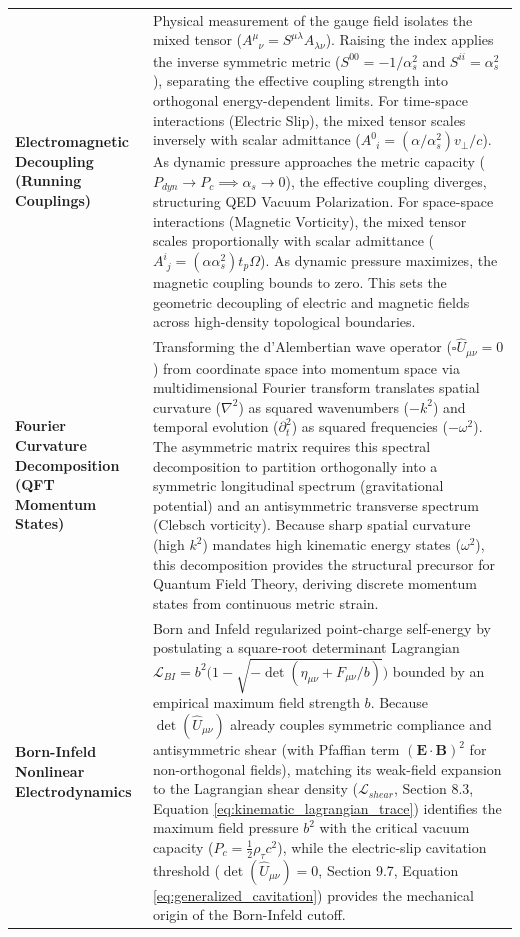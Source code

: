\begin{longtable}{p{} p{}}
    \textbf{Electromagnetic Decoupling (Running Couplings)} & Physical measurement of the gauge field isolates the mixed tensor ($A^\mu_{\phantom{\mu}\nu} = S^{\mu\lambda}A_{\lambda\nu}$). Raising the index applies the inverse symmetric metric ($S^{00} = -1/\alpha_s^2$ and $S^{ii} = \alpha_s^2$), separating the effective coupling strength into orthogonal energy-dependent limits. For time-space interactions (Electric Slip), the mixed tensor scales inversely with scalar admittance ($A^0_{\phantom{0}i} = (\alpha/\alpha_s^2) v_{\perp}/c$). As dynamic pressure approaches the metric capacity ($P_{dyn} \to P_c \implies \alpha_s \to 0$), the effective coupling diverges, structuring QED Vacuum Polarization. For space-space interactions (Magnetic Vorticity), the mixed tensor scales proportionally with scalar admittance ($A^i_{\phantom{i}j} = (\alpha \alpha_s^2) t_p \Omega$). As dynamic pressure maximizes, the magnetic coupling bounds to zero. This sets the geometric decoupling of electric and magnetic fields across high-density topological boundaries. \\ 
    \textbf{Fourier Curvature Decomposition (QFT Momentum States)} & Transforming the d'Alembertian wave operator ($\square \hat{U}_{\mu\nu} = 0$) from coordinate space into momentum space via multidimensional Fourier transform translates spatial curvature ($\nabla^2$) as squared wavenumbers ($-k^2$) and temporal evolution ($\partial_t^2$) as squared frequencies ($-\omega^2$). The asymmetric matrix requires this spectral decomposition to partition orthogonally into a symmetric longitudinal spectrum (gravitational potential) and an antisymmetric transverse spectrum (Clebsch vorticity). Because sharp spatial curvature (high $k^2$) mandates high kinematic energy states ($\omega^2$), this decomposition provides the structural precursor for Quantum Field Theory, deriving discrete momentum states from continuous metric strain. \\ 
    \textbf{Born-Infeld Nonlinear Electrodynamics} & Born and Infeld \cite{BornInfeld1934} regularized point-charge self-energy by postulating a square-root determinant Lagrangian $\mathcal{L}_{BI} = b^2\big(1 - \sqrt{-\det(\eta_{\mu\nu} + F_{\mu\nu}/b)}\big)$ bounded by an empirical maximum field strength $b$. Because $\det(\hat{U}_{\mu\nu})$ already couples symmetric compliance and antisymmetric shear (with Pfaffian term $(\mathbf{E}\cdot\mathbf{B})^2$ for non-orthogonal fields), matching its weak-field expansion to the Lagrangian shear density ($\mathcal{L}_{shear}$, Section 8.3, Equation \ref{eq:kinematic_lagrangian_trace}) identifies the maximum field pressure $b^2$ with the critical vacuum capacity ($P_c = \frac{1}{2}\rho_\tau c^2$), while the electric-slip cavitation threshold ($\det(\hat{U}_{\mu\nu}) = 0$, Section 9.7, Equation \ref{eq:generalized_cavitation}) provides the mechanical origin of the Born-Infeld cutoff. \\
    \hline
\end{longtable}
\newpage

